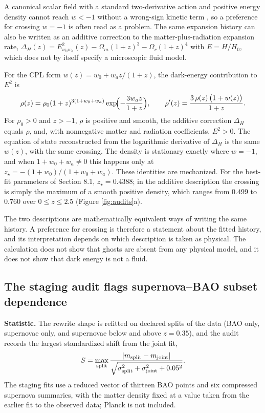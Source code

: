 A canonical scalar field with a standard two-derivative action and
positive energy density cannot reach \(w<-1\) without a wrong-sign
kinetic term \citep{Caldwell2002, Vikman2005}, so a preference for
crossing \(w=-1\) is often read as a problem. The same expansion history
can also be written as an additive correction to the
matter-plus-radiation expansion rate,
\(\Delta_H(z)=E^2_{w_0w_a}(z)-\Omega_m(1+z)^3-\Omega_r(1+z)^4\) with
\(E=H/H_0\), which does not by itself specify a microscopic fluid model.

For the CPL form \(w(z)=w_0+w_az/(1+z)\), the dark-energy contribution
to \(E^2\) is
\[\rho(z)=\rho_0(1+z)^{3(1+w_0+w_a)}\exp\!\Bigl(-\frac{3w_az}{1+z}\Bigr),\qquad
\rho'(z)=\frac{3\,\rho(z)\,\bigl(1+w(z)\bigr)}{1+z}.\] For \(\rho_0>0\)
and \(z>-1\), \(\rho\) is positive and smooth, the additive correction
\(\Delta_H\) equals \(\rho\), and, with nonnegative matter and radiation
coefficients, \(E^2>0\). The equation of state reconstructed from the
logarithmic derivative of \(\Delta_H\) is the same \(w(z)\), with the
same crossing. The density is stationary exactly where \(w=-1\), and
when \(1+w_0+w_a\ne0\) this happens only at
\(z_\star=-(1+w_0)/(1+w_0+w_a)\). These identities are mechanized. For
the best-fit parameters of Section 8.1, \(z_\star=0.4388\); in the
additive description the crossing is simply the maximum of a smooth
positive density, which ranges from \(0.499\) to \(0.760\) over
\(0\le z\le2.5\) (Figure \ref{fig:audits}a).

The two descriptions are mathematically equivalent ways of writing the
same history. A preference for crossing is therefore a statement about
the fitted history, and its interpretation depends on which description
is taken as physical. The calculation does not show that ghosts are
absent from any physical model, and it does not show that dark energy is
not a fluid.

\hypertarget{the-staging-audit-flags-supernovabao-subset-dependence}{%
\subsection{The staging audit flags supernova--BAO subset
dependence}\label{the-staging-audit-flags-supernovabao-subset-dependence}}

\textbf{Statistic.} The rewrite shape is refitted on declared splits of
the data (BAO only, supernovae only, and supernovae below and above
\(z=0.35\)), and the audit records the largest standardized shift from
the joint fit,
\[S=\max_{\rm split}\frac{|m_{\rm split}-m_{\rm joint}|}{\sqrt{\sigma^2_{\rm split}+\sigma^2_{\rm joint}+0.05^2}} .\]
The staging fits use a reduced vector of thirteen BAO points and six
compressed supernova summaries, with the matter density fixed at a value
taken from the earlier fit to the observed data; Planck is not included.

